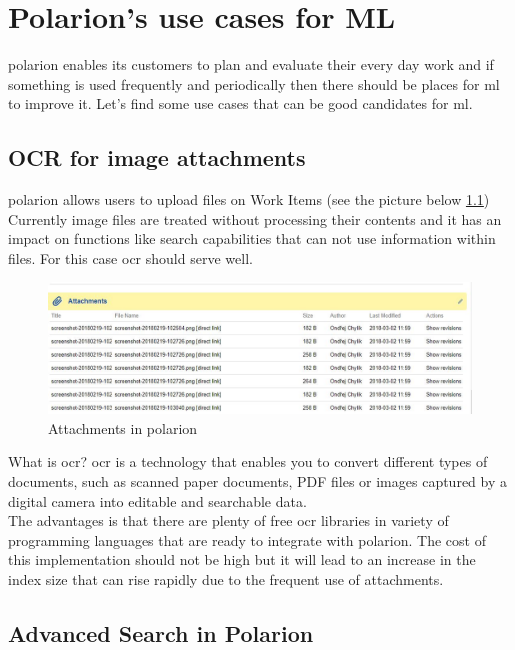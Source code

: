 \documentclass[thesis=M,english]{FITthesis}[2012/06/26]
\begin{document}
\chapter{Polarion's use cases for ML}

\acrshort{polarion} enables its customers to plan and evaluate their every day work and if something is used frequently and periodically then there should be places for \acrshort{ml} to improve it. Let's find some use cases that can be good candidates for \acrshort{ml}. 

\section{OCR for image attachments}

\acrshort{polarion} allows users to upload files on Work Items (see the picture below \ref{fig:polarion_attachments}) Currently image files are treated without processing their contents and it has an impact on functions like search capabilities that can not use information within files. For this case \acrshort{ocr} should serve well.

\begin{figure}[h!]\centering
	\includegraphics[width=1\textwidth]{pictures/polarion_attachments}
	\caption{Attachments in \acrshort{polarion}}\label{fig:polarion_attachments}
\end{figure}

What is \acrshort{ocr}? \acrshort{ocr} is a technology that enables you to convert different types of documents, such as scanned paper documents, PDF files or images captured by a digital camera into editable and searchable data. \\

The advantages is that there are plenty of free \acrshort{ocr} libraries in variety of programming languages that are ready to integrate with \acrshort{polarion}. The cost of this implementation should not be high but it will lead to an increase in the index size that can rise rapidly due to the frequent use of attachments.  

\section{Advanced Search in Polarion}
\end{document}
